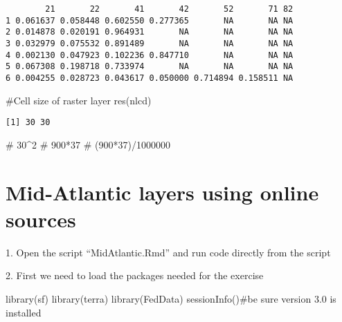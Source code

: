 \documentclass[
  letterpaper,
]{book}
\newenvironment{Shaded}{\begin{snugshade}}{\end{snugshade}}
\newcommand{\CommentTok}[1]{\textcolor[rgb]{0.37,0.37,0.37}{#1}}
\newcommand{\FunctionTok}[1]{\textcolor[rgb]{0.28,0.35,0.67}{#1}}
\newcommand{\NormalTok}[1]{\textcolor[rgb]{0.00,0.23,0.31}{#1}}
\begin{document}
\begin{verbatim}
        21       22       41       42       52       71 82
1 0.061637 0.058448 0.602550 0.277365       NA       NA NA
2 0.014878 0.020191 0.964931       NA       NA       NA NA
3 0.032979 0.075532 0.891489       NA       NA       NA NA
4 0.002130 0.047923 0.102236 0.847710       NA       NA NA
5 0.067308 0.198718 0.733974       NA       NA       NA NA
6 0.004255 0.028723 0.043617 0.050000 0.714894 0.158511 NA
\end{verbatim}

\begin{Shaded}
\begin{Highlighting}[]
\CommentTok{\#Cell size of raster layer}
\FunctionTok{res}\NormalTok{(nlcd)}
\end{Highlighting}
\end{Shaded}

\begin{verbatim}
[1] 30 30
\end{verbatim}

\begin{Shaded}
\begin{Highlighting}[]
\CommentTok{\# 30\^{}2}
\CommentTok{\# 900*37}
\CommentTok{\# (900*37)/1000000}
\end{Highlighting}
\end{Shaded}

\hypertarget{mid-atlantic-layers-using-online-sources}{%
\chapter{Mid-Atlantic layers using online
sources}\label{mid-atlantic-layers-using-online-sources}}

1. Open the script ``MidAtlantic.Rmd'' and run code directly from the
script

2. First we need to load the packages needed for the exercise

\begin{Shaded}
\begin{Highlighting}[]
\FunctionTok{library}\NormalTok{(sf)}
\FunctionTok{library}\NormalTok{(terra)}
\FunctionTok{library}\NormalTok{(FedData)}
\FunctionTok{sessionInfo}\NormalTok{()}\CommentTok{\#be sure version 3.0 is installed}
\end{Highlighting}
\end{Shaded}
\end{document}

